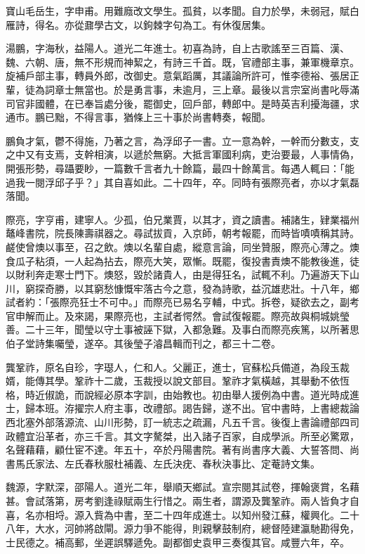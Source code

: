 \begin{pinyinscope}
寶山毛岳生，字申甫。用難廕改文學生。孤貧，以孝聞。自力於學，未弱冠，賦白雁詩，得名。亦從鼐學古文，以鉤棘字句為工。有休復居集。

湯鵬，字海秋，益陽人。道光二年進士。初喜為詩，自上古歌謠至三百篇、漢、魏、六朝、唐，無不形規而神絜之，有詩三千首。既，官禮部主事，兼軍機章京。旋補戶部主事，轉員外郎，改御史。意氣蹈厲，其議論所許可，惟李德裕、張居正輩，徒為詞章士無當也。於是勇言事，未逾月，三上章。最後以言宗室尚書叱辱滿司官非國體，在已奉旨處分後，罷御史，回戶部，轉郎中。是時英吉利擾海疆，求通市。鵬已黜，不得言事，猶條上三十事於尚書轉奏，報聞。

鵬負才氣，鬱不得施，乃著之言，為浮邱子一書。立一意為幹，一幹而分數支，支之中又有支焉，支幹相演，以遞於無窮。大抵言軍國利病，吏治要最，人事情偽，開張形勢，尋躡要眇，一篇數千言者九十餘篇，最四十餘萬言。每遇人輒曰：「能過我一閱浮邱子乎？」其自喜如此。二十四年，卒。同時有張際亮者，亦以才氣磊落聞。

際亮，字亨甫，建寧人。少孤，伯兄業賈，以其才，資之讀書。補諸生，肄業福州鼇峰書院，院長陳壽祺器之。尋試拔貢，入京師，朝考報罷，而時皆嘖嘖稱其詩。鹺使曾燠以事至，召之飲。燠以名輩自處，縱意言論，同坐贊服，際亮心薄之。燠食瓜子粘須，一人起為拈去，際亮大笑，眾慚。既罷，復投書責燠不能教後進，徒以財利奔走寒士門下。燠怒，毀於諸貴人，由是得狂名，試輒不利。乃遍游天下山川，窮探奇勝，以其窮愁慷慨牢落古今之意，發為詩歌，益沉雄悲壯。十八年，鄉試者約：「張際亮狂士不可中。」而際亮已易名亨輔，中式。拆卷，疑欲去之，副考官申解而止。及來謁，果際亮也，主試者愕然。會試復報罷。際亮故與桐城姚瑩善。二十三年，聞瑩以守土事被誣下獄，入都急難。及事白而際亮疾篤，以所著思伯子堂詩集囑瑩，遂卒。其後瑩子濬昌輯而刊之，都三十二卷。

龔鞏祚，原名自珍，字璱人，仁和人。父麗正，進士，官蘇松兵備道，為段玉裁婿，能傳其學。鞏祚十二歲，玉裁授以說文部目。鞏祚才氣橫越，其舉動不依恆格，時近俶詭，而說經必原本字訓，由始教也。初由舉人援例為中書。道光時成進士，歸本班。洊擢宗人府主事，改禮部。謁告歸，遂不出。官中書時，上書總裁論西北塞外部落源流、山川形勢，訂一統志之疏漏，凡五千言。後復上書論禮部四司政體宜沿革者，亦三千言。其文字驁桀，出入諸子百家，自成學派。所至必驚眾，名聲藉藉，顧仕宦不達。年五十，卒於丹陽書院。著有尚書序大義、大誓答問、尚書馬氏家法、左氏春秋服杜補義、左氏決疣、春秋決事比、定菴詩文集。

魏源，字默深，邵陽人。道光二年，舉順天鄉試。宣宗閱其試卷，揮翰褒賞，名藉甚。會試落第，房考劉逢祿賦兩生行惜之。兩生者，謂源及龔鞏祚。兩人皆負才自喜，名亦相埒。源入貲為中書，至二十四年成進士。以知州發江蘇，權興化。二十八年，大水，河帥將啟閘。源力爭不能得，則親擊鼓制府，總督陸建瀛馳勘得免，士民德之。補高郵，坐遲誤驛遞免。副都御史袁甲三奏復其官。咸豐六年，卒。


\end{pinyinscope}
